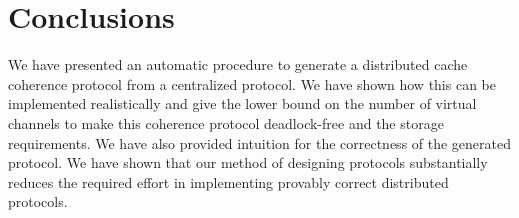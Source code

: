 \section{Conclusions}
\label{sec:conclusion}

We have presented an automatic procedure to generate a distributed cache
coherence protocol from a centralized protocol. We have shown how this can be
implemented realistically and give the lower bound on the number of virtual
channels to make this coherence protocol deadlock-free and the storage
requirements. We have also provided intuition for the correctness of the
generated protocol. We have shown that our method of designing protocols
substantially reduces the required effort in implementing provably correct
distributed protocols. 
